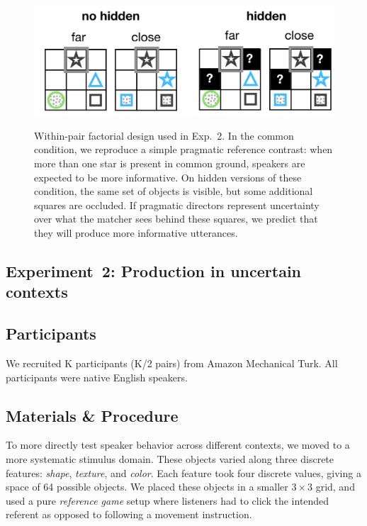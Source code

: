 \documentclass[manuscript]{stjour}
\begin{document}
  \begin{figure}[t!]
 \begin{center}
 \vspace{-.5cm}
 \includegraphics[scale=.3]{figures/Exp2_design}
 \caption{Within-pair factorial design used in Exp.~2. In the common condition, we reproduce a simple pragmatic reference contrast: when more than one star is present in common ground, speakers are expected to be more informative. On hidden versions of these condition, the same set of objects is visible, but some additional squares are occluded. If pragmatic directors represent uncertainty over what the matcher sees behind these squares, we predict that they will produce more informative utterances.}
 \vspace{-.5cm}
 \label{fig:hover}
 \end{center}
 \end{figure}

\subsection{Experiment~2: Production in uncertain contexts}
\label{sec:Exp2}

\subsection{Participants}

We recruited K participants (K/2 pairs) from Amazon Mechanical Turk. All participants were native English speakers. %

\subsection{Materials \& Procedure}

To more directly test speaker behavior across different contexts, we moved to a more systematic stimulus domain. These objects varied along three discrete features: \emph{shape}, \emph{texture}, and \emph{color}. Each feature took four discrete values, giving a space of 64 possible objects. We placed these objects in a smaller $3 \times 3$ grid, and used a pure \emph{reference game} setup where listeners had to click the intended referent as opposed to following a movement instruction. 
\end{document}
